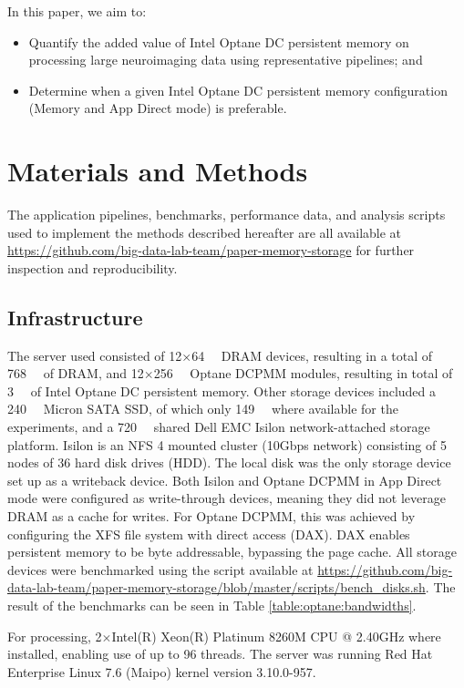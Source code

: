 In this paper, we aim to:
\begin{itemize}
        \item Quantify the added value of Intel Optane DC persistent memory on
            processing large neuroimaging data using representative pipelines;
            and
        \item Determine when a given Intel Optane DC persistent memory
            configuration (Memory and App Direct mode) is preferable.
\end{itemize}

\section{Materials and Methods}
The application pipelines, benchmarks, performance data, and analysis scripts
used to implement the methods described hereafter are all available at
\url{https://github.com/big-data-lab-team/paper-memory-storage} for further
inspection and reproducibility.

\subsection{Infrastructure}

The server used consisted of 12$\times$\SI{64}{\gibi\byte} DRAM devices,
resulting in a total of \SI{768}{\gibi\byte} of DRAM, and
12$\times$\SI{256}{\gibi\byte} Optane DCPMM modules, resulting in total of
\SI{3}{\tebi\byte} of Intel Optane DC persistent memory. Other storage devices
included a \SI{240}{\gibi\byte} Micron SATA SSD, of which only
\SI{149}{\gibi\byte} where available for the experiments, and a
\SI{720}{\tebi\byte} shared Dell EMC Isilon network-attached storage platform.
Isilon is an NFS 4 mounted cluster (10Gbps network) consisting of 5 nodes of 36
hard disk drives (HDD). The local disk was the only storage device set up as a
writeback device. Both Isilon and Optane DCPMM in App Direct mode were
configured as write-through devices, meaning they did not leverage DRAM as a
cache for writes. For Optane DCPMM, this was achieved by configuring the XFS
file system with direct access (DAX). DAX enables persistent memory to be byte
addressable, bypassing the page cache. All storage devices were benchmarked
using the script available at
\url{https://github.com/big-data-lab-team/paper-memory-storage/blob/master/scripts/bench_disks.sh}.
The result of the benchmarks can be seen in Table \ref{table:optane:bandwidths}.

For processing, 2$\times$Intel(R) Xeon(R) Platinum 8260M CPU @ 2.40GHz where
installed, enabling use of up to 96 threads. The server was running Red Hat
Enterprise Linux 7.6 (Maipo) kernel version 3.10.0-957. 


